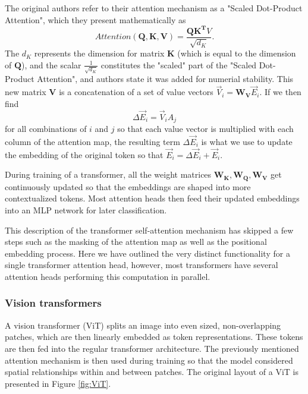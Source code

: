 The original authors refer to their attention mechanism as a "Scaled Dot-Product Attention", which they present mathematically as
\begin{equation}
    Attention(\boldsymbol{Q, K, V}) = \frac{\boldsymbol{QK^T} V}{\sqrt{d_K}}.
\end{equation}
The $d_K$ represents the dimension for matrix $\boldsymbol{K}$ (which is equal to the dimension of $\boldsymbol{Q}$), and the scalar $\frac{1}{\sqrt{d_K}}$ constitutes the "scaled" part of the "Scaled Dot-Product Attention", and authors state it was added for numerial stability. This new matrix $\boldsymbol{V}$ is a concatenation of a set of value vectors $\vec{V}_i = \boldsymbol{W_V}\vec{E}_i$. If we then find
\begin{equation}
    \Delta\vec{E}_i = \vec{V}_i A_j  
\end{equation}
for all combinations of $i$ and $j$ so that each value vector is multiplied with each column of the attention map, the resulting term $\Delta\vec{E}_i$ is what we use to update the embedding of the original token so that $\vec{E}_i  = \Delta\vec{E}_i + \vec{E}_i $. 

During training of a transformer, all the weight matrices $\boldsymbol{W_K, W_Q , W_V}$ get continuously updated so that the embeddings are shaped into more contextualized tokens. Most attention heads then feed their updated embeddings into an MLP network for later classification. 

This description of the transformer self-attention mechanism has skipped a few steps such as the masking of the attention map as well as the positional embedding process. Here we have outlined the very distinct functionality for a single transformer attention head, however, most transformers have several attention heads performing this computation in parallel. 

\subsubsection{Vision transformers}

A vision transformer (ViT) splits an image into even sized, non-overlapping patches, which are then linearly embedded
as token representations. These tokens are then fed into the regular transformer architecture. The previously mentioned attention mechanism is then used during training
so that the model considered spatial relationships within and between patches. The original layout of a ViT is presented in Figure \ref{fig:ViT}.

